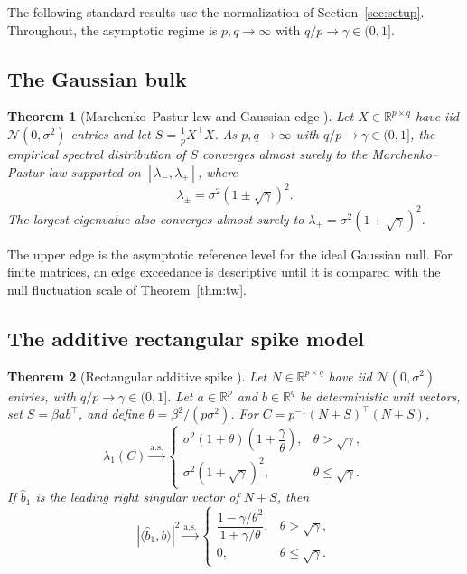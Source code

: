 \documentclass[11pt]{article}
\newtheorem{theorem}{Theorem}[section]
\theoremstyle{definition}
\theoremstyle{remark}
\newcommand{\R}{\mathbb{R}}
\newcommand{\inner}[2]{\langle #1, #2 \rangle}
\newcommand{\as}{\text{a.s.}}
\begin{document}
The following standard results use the normalization of
Section~\ref{sec:setup}. Throughout, the asymptotic regime is
$p, q \to \infty$ with $q/p \to \gamma \in (0,1]$.

\subsection{The Gaussian bulk}

\begin{theorem}[Marchenko--Pastur law and Gaussian edge
\cite{marchenko1967,bai2010}]
\label{thm:mp}
Let $X \in \R^{p \times q}$ have iid $\mathcal N(0,\sigma^2)$ entries and let
$S = \tfrac1p X^{\!\top} X$. As $p,q \to \infty$ with $q/p \to \gamma
\in (0,1]$, the empirical spectral distribution of $S$ converges almost surely
to the Marchenko--Pastur law supported on $[\lambda_-,\lambda_+]$, where
\[
  \lambda_\pm=\sigma^2(1\pm\sqrt\gamma)^2.
\]
The largest eigenvalue also converges almost surely to
$\lambda_+=\sigma^2(1+\sqrt\gamma)^2$.
\end{theorem}

The upper edge is the asymptotic reference level for the ideal Gaussian null.
For finite matrices, an edge exceedance is descriptive until it is compared with
the null fluctuation scale of Theorem~\ref{thm:tw}.

\subsection{The additive rectangular spike model}

\begin{theorem}[Rectangular additive spike \cite{benaych2012}]
\label{thm:additive}
Let $N\in\R^{p\times q}$ have iid $\mathcal N(0,\sigma^2)$ entries, with
$q/p\to\gamma\in(0,1]$. Let $a\in\R^p$ and $b\in\R^q$ be deterministic unit
vectors, set $S=\beta ab^{\!\top}$, and define
$\theta=\beta^2/(p\sigma^2)$. For
$C=p^{-1}(N+S)^{\!\top}(N+S)$,
\[
  \lambda_1(C)\xrightarrow{\as}
  \begin{cases}
    \sigma^2(1+\theta)\left(1+\dfrac{\gamma}{\theta}\right),
      & \theta>\sqrt\gamma,\\[1.4ex]
    \sigma^2(1+\sqrt\gamma)^2, & \theta\le\sqrt\gamma.
  \end{cases}
\]
If $\hat b_1$ is the leading right singular vector of $N+S$, then
\[
  |\inner{\hat b_1}{b}|^2\xrightarrow{\as}
  \begin{cases}
    \dfrac{1-\gamma/\theta^2}{1+\gamma/\theta},
      & \theta>\sqrt\gamma,\\[1.4ex]
    0, & \theta\le\sqrt\gamma.
  \end{cases}
\]
\end{theorem}
\end{document}
